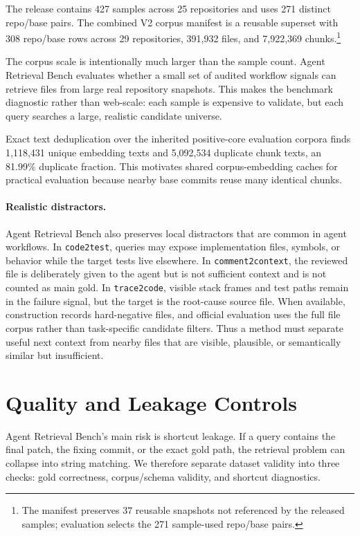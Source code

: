 \documentclass[11pt]{article}
\newcommand{\arb}{Agent Retrieval Bench}
\newcommand{\code}[1]{\texttt{#1}}
\begin{document}
The release contains 427 samples across 25 repositories and uses 271 distinct repo/base pairs. The combined V2 corpus manifest is a reusable superset with 308 repo/base rows across 29 repositories, 391,932 files, and 7,922,369 chunks.\footnote{The manifest preserves 37 reusable snapshots not referenced by the released samples; evaluation selects the 271 sample-used repo/base pairs.}

The corpus scale is intentionally much larger than the sample count. \arb{} evaluates whether a small set of audited workflow signals can retrieve files from large real repository snapshots. This makes the benchmark diagnostic rather than web-scale: each sample is expensive to validate, but each query searches a large, realistic candidate universe.

Exact text deduplication over the inherited positive-core evaluation corpora finds 1,118,431 unique embedding texts and 5,092,534 duplicate chunk texts, an 81.99\% duplicate fraction. This motivates shared corpus-embedding caches for practical evaluation because nearby base commits reuse many identical chunks.

\paragraph{Realistic distractors.}
\arb{} also preserves local distractors that are common in agent workflows. In \code{code2test}, queries may expose implementation files, symbols, or behavior while the target tests live elsewhere. In \code{comment2context}, the reviewed file is deliberately given to the agent but is not sufficient context and is not counted as main gold. In \code{trace2code}, visible stack frames and test paths remain in the failure signal, but the target is the root-cause source file. When available, construction records hard-negative files, and official evaluation uses the full file corpus rather than task-specific candidate filters. Thus a method must separate useful next context from nearby files that are visible, plausible, or semantically similar but insufficient.

\section{Quality and Leakage Controls}

\arb{}'s main risk is shortcut leakage. If a query contains the final patch, the fixing commit, or the exact gold path, the retrieval problem can collapse into string matching. We therefore separate dataset validity into three checks: gold correctness, corpus/schema validity, and shortcut diagnostics.
\end{document}
